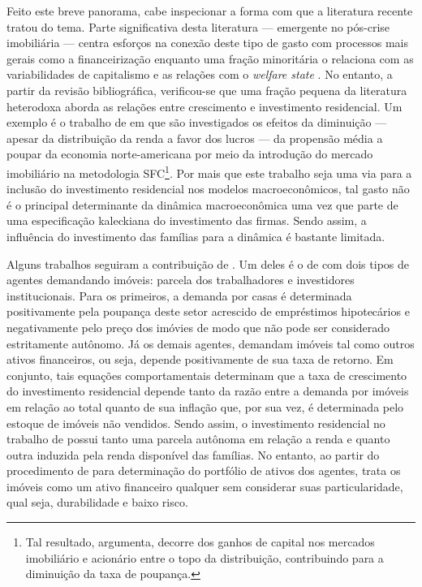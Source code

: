Feito este breve panorama, cabe inspecionar a forma com que a literatura recente tratou do tema. 
Parte significativa desta literatura  --- emergente no pós-crise imobiliária --- centra esforços na conexão deste tipo de gasto com processos mais gerais como a financeirização \cites{aalbers_financialization_2008}{bibow_financialization_2010}
enquanto uma fração minoritária o relaciona com as variabilidades
de capitalismo e as relações com o \textit{welfare state} \cite{schwartz_politics_2009}. No
entanto, a partir da revisão bibliográfica, verificou-se que uma fração pequena da literatura heterodoxa aborda as relações entre crescimento e investimento residencial.
Um  exemplo é o trabalho de \textcite{zezza_u.s._2008} em que são investigados os efeitos da diminuição --- apesar da distribuição da renda a favor dos lucros --- da propensão média a poupar da economia norte-americana por meio da introdução do mercado imobiliário na metodologia SFC\footnote{
	Tal resultado, argumenta, decorre dos ganhos de capital nos mercados imobiliário e acionário entre o topo da distribuição, contribuindo para a diminuição da taxa de poupança.
}. 
Por mais que este trabalho seja uma via para a inclusão do investimento residencial nos modelos macroeconômicos, tal gasto não é o principal determinante da dinâmica macroeconômica uma vez que parte de uma especificação kaleckiana do investimento das firmas.
Sendo assim, a influência do investimento das famílias para a dinâmica é bastante limitada.


Alguns trabalhos seguiram a contribuição de \textcite{zezza_u.s._2008}.
Um deles é o de \textcite{nikolaidi_securitisation_2015} com dois tipos de agentes demandando imóveis: parcela dos trabalhadores e investidores institucionais.
Para os primeiros, a demanda por casas é determinada positivamente pela poupança deste setor acrescido de empréstimos hipotecários e negativamente pelo preço dos imóvies de modo que não pode ser considerado estritamente autônomo.
Já os demais agentes, demandam imóveis tal como outros ativos financeiros, ou seja, depende positivamente de sua taxa de retorno.
Em conjunto, tais equações comportamentais determinam que a taxa de crescimento do investimento residencial depende tanto da razão entre a demanda por imóveis em relação ao total quanto de sua inflação que, por sua vez, é determinada pelo estoque de imóveis não vendidos.
Sendo assim, o investimento residencial no trabalho de \textcite{nikolaidi_securitisation_2015} possui tanto uma parcela autônoma em relação a renda e quanto outra induzida pela renda disponível das famílias.
No entanto, ao partir do procedimento de \textcite{godley_money_1999} para determinação do portfólio de ativos dos agentes, trata os imóveis como um ativo financeiro qualquer sem considerar suas particularidade, qual seja, durabilidade e baixo risco.

